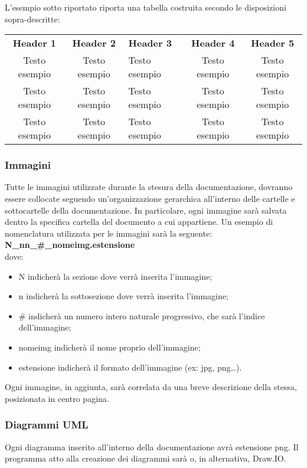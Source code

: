 L’esempio sotto riportato riporta una tabella costruita secondo le disposizioni sopra-descritte:
{
    \renewcommand{\arraystretch}{1.5}
    \centering
    \begin{longtable}{ c c  C{4cm}  c  c }
        \rowcolor{\primaryColor}
        \textcolor{\secondaryColor}{
        \textbf{Header 1}}     & \textcolor{\secondaryColor}{\textbf{Header 2}}       & \textcolor{\secondaryColor}
        {\textbf{Header 3}} & \textcolor{\secondaryColor}{\textbf{Header 4}} & \textcolor{\secondaryColor}{\textbf{Header 5}}                          \\
        Testo esempio                 & Testo esempio                                    & Testo esempio                                & Testo esempio & Testo esempio{} \\
        Testo esempio                & Testo esempio                                    & Testo esempio                                   & Testo esempio & Testo esempio{} \\
        Testo esempio                & Testo esempio                                    & Testo esempio                          & Testo esempio & Testo esempio{}    \\
    \end{longtable}
}

\subsubsection{Immagini}
Tutte le immagini utilizzate durante la stesura della documentazione, dovranno essere collocate seguendo un'organizzazione gerarchica all’interno delle cartelle e sottocartelle della documentazione. In particolare, ogni immagine sarà salvata dentro la specifica cartella del documento a cui appartiene. Un esempio di nomenclatura utilizzata per le immagini sarà la seguente:
\textbf{N\_nn\_\#\_nomeimg.estensione}\\
dove:
\begin{itemize}
	\item N indicherà la sezione dove verrà inserita l’immagine;
	\item n indicherà la sottosezione dove verrà inserita l’immagine;
	\item \# indicherà un numero intero naturale progressivo, che sarà l’indice dell’immagine;
	\item nomeimg indicherà il nome proprio dell’immagine;
	\item estensione indicherà il formato dell’immagine (ex: jpg, png…).
\end{itemize}
Ogni immagine, in aggiunta, sarà correlata da una breve descrizione della stessa, posizionata in centro pagina.

\subsubsection{Diagrammi UML}
Ogni diagramma  inserito all’interno della documentazione avrà estensione png. Il programma atto alla creazione dei diagrammi  sarà  o, in alternativa, Draw.IO.

